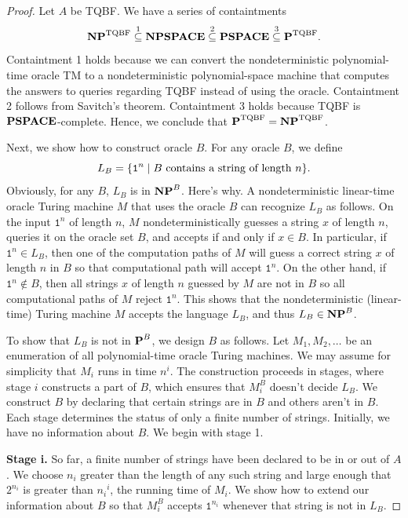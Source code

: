 \begin{proof}
  Let $A$ be TQBF. We have a series of containtments
  \[ \textbf{NP}^{\text{TQBF}} \overset{1}{\subseteq} \textbf{NPSPACE} \overset{2}{\subseteq} \textbf{PSPACE} \overset{3}{\subseteq} \textbf{P}^{\text{TQBF}}. \]
  Containtment 1 holds because we can convert the nondeterministic polynomial-time oracle TM to a nondeterministic polynomial-space machine that computes the answers to queries regarding TQBF instead of using the oracle. Containtment 2 follows from Savitch's theorem. Containtment 3 holds because TQBF is $\textbf{PSPACE}$-complete. Hence, we conclude that $\textbf{P}^{\text{TQBF}} = \textbf{NP}^{\text{TQBF}}$.

  Next, we show how to construct oracle $B$. For any oracle $B$, we define
  \[ L_B = \{ \texttt{1}^n \mid \text{$B$ contains a string of length $n$}  \}. \]
  Obviously, for any $B$, $L_B$ is in $\textbf{NP}^B$. Here's why. A nondeterministic linear-time oracle Turing machine $M$ that uses the oracle $B$ can recognize $L_B$ as follows. On the input $\texttt{1}^n$ of length $n$, $M$ nondeterministically guesses a string $x$ of length $n$, queries it on the oracle set $B$, and accepts if and only if $x \in B$. In particular, if $\texttt{1}^n \in L_B$, then one of the computation paths of $M$ will guess a correct string $x$ of length $n$ in $B$ so that computational path will accept $\texttt{1}^n$. On the other hand, if $\texttt{1}^n \notin B$, then all strings $x$ of length $n$ guessed by $M$ are not in $B$ so all computational paths of $M$ reject $\texttt{1}^n$. This shows that the nondeterministic (linear-time) Turing machine $M$ accepts the language $L_B$, and thus $L_B \in \textbf{NP}^B$.

  To show that $L_B$ is not in $\textbf{P}^B$, we design $B$ as follows. Let $M_1, M_2, \dots$ be an enumeration of all polynomial-time oracle Turing machines. We may assume for simplicity that $M_i$ runs in time $n^i$. The construction proceeds in stages, where stage $i$ constructs a part of $B$, which ensures that $M_i^B$ doesn't decide $L_B$. We construct $B$ by declaring that certain strings are in $B$ and others aren't in $B$. Each stage determines the status of only a finite number of strings. Initially, we have no information about $B$. We begin with stage 1.

  \textbf{Stage i.} So far, a finite number of strings have been declared to be in or out of $A$. We choose $n_i$ greater than the length of any such string and large enough that $2^{n_i}$ is greater than ${n_i}^i$, the running time of $M_i$. We show how to extend our information about $B$ so that $M_i^B$ accepts $\texttt{1}^{n_i}$ whenever that string is not in $L_B$.


\end{proof}
